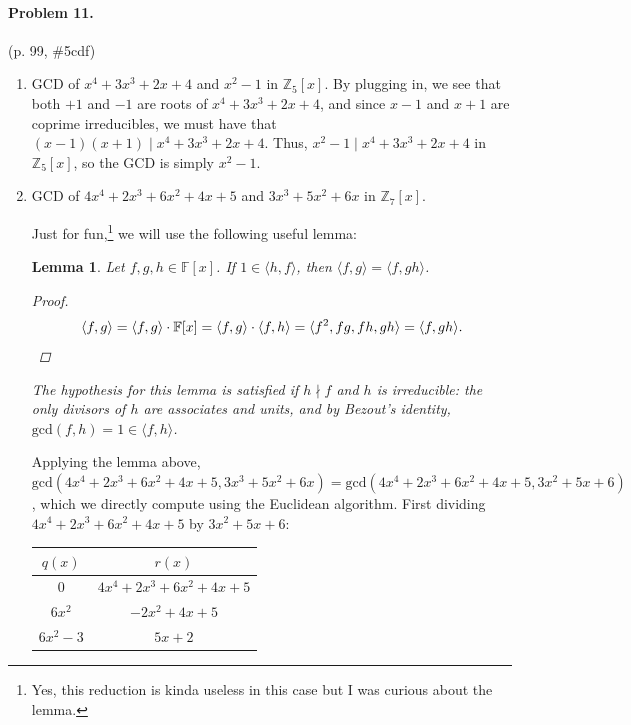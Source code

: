 \documentclass[12pt]{article}
\newtheorem{lemma}[theorem]{Lemma}
\begin{document}
\newpage{}
\paragraph{Problem 11.} (p. 99, \#5cdf)
\begin{enumerate}
\item[c.] GCD of $x^4 + 3x^3 + 2x+4$ and $x^2 - 1$ in $\mathbb Z_5[x]$. {
    By plugging in, we see that both $+1$ and $-1$ are roots of $x^4 + 3x^3 + 2x + 4$, and since $x-1$ and $x+1$ are coprime irreducibles, we must have that $(x-1)(x+1) \mid x^4 + 3x^3 + 2x+4$. Thus, $x^2 - 1 \mid x^4 + 3x^3 + 2x + 4$ in $\mathbb Z_5[x]$, so the GCD is simply $x^2 - 1$.
}
\item[d.] GCD of $4x^4 + 2x^3 + 6x^2 + 4x + 5$ and $3x^3 + 5x^2 + 6x$ in $\mathbb Z_7[x]$. {
    Just for fun,\footnote{Yes, this reduction is kinda useless in this case but I was curious about the lemma.} we will use the following useful lemma:

    \begin{lemma}
    Let $f,g,h \in \mathbb F[x]$. If $1 \in \langle h, f \rangle$, then $\langle f, g \rangle = \langle f, g h \rangle$.
    \begin{proof} 
        \[\langle f, g \rangle = \langle f, g \rangle \cdot \mathbb F[x] = \langle f, g \rangle \cdot \langle f, h \rangle = \langle f^2, f g, f h, g h \rangle = \langle f, gh\rangle. \qedhere \]
    \end{proof}

    The hypothesis for this lemma is satisfied if $h \nmid f$ and $h$ is irreducible: the only divisors of $h$ are associates and units, and by Bezout's identity, $\mathrm{gcd}(f, h) = 1 \in \langle f, h\rangle$.
\end{lemma}

    Applying the lemma above, $\mathrm{gcd}(4x^4 + 2x^3 + 6x^2 + 4x+5, 3x^3 + 5x^2 + 6x) = \mathrm{gcd}(4x^4 + 2x^3 + 6x^2 + 4x + 5, 3x^2+ 5x + 6)$, which we directly compute using the Euclidean algorithm. First dividing $4x^4 + 2x^3 +6x^2 + 4x + 5$ by $3x^2 + 5x + 6$:
    
    {\centering \noindent
    \begin{tabular}{|c|c|}
        \hline $q(x)$ & $r(x)$ \\\hline
        0 & $4x^4 + 2x^3 + 6x^2 + 4x + 5$ \\ \hline
        $6x^2$ & $-2x^2 + 4x + 5$ \\ \hline
        $6x^2 - 3$ & $5x + 2$ \\ \hline
    \end{tabular} \par}

}
\end{enumerate}
\end{document}
